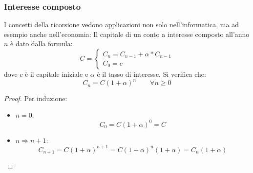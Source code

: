 \subsubsection{Interesse composto}
I concetti della ricorsione vedono applicazioni non solo nell'informatica, ma ad esempio anche nell'economia:
Il capitale di un conto a interesse composto all'anno $n$ è dato dalla formula:
\[
	C=
	\begin{cases}
		C_n=C_{n-1}+\alpha*C_{n-1} \\
		C_0=c
	\end{cases}
\]
dove $c$ è il capitale iniziale e $\alpha$ è il tasso di interesse. Si verifica che:
\[
	C_n=C(1+\alpha)^n \qquad \forall n\geq0
\]
\begin{proof}
	Per induzione:
	\begin{itemize}
		\item $n=0$:
		      \[ C_0=C(1+\alpha)^0=C \]
		\item $n \Rightarrow n+1$:
		      \[ C_{n+1}=C(1+\alpha)^{n+1}=C(1+\alpha)^n(1+\alpha)=C_n(1+\alpha) \]
	\end{itemize}
\end{proof}
